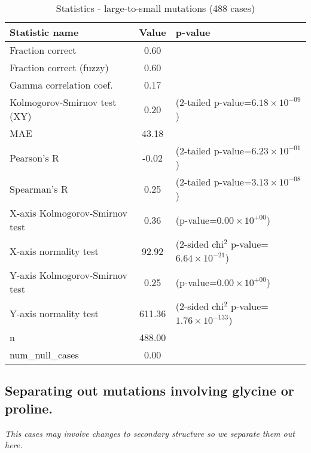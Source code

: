 \documentclass[10pt, letterpaper, oneside, titlepage, landscape]{scrreprt}
\begin{document}
\begin{table}[H]\begin{center}
\begin{tabular}{ l S[table-format=3.2] l}
Statistic name & {Value} & p-value\\
\hline
Fraction correct & 0.60 & \\
Fraction correct (fuzzy) & 0.60 & \\
Gamma correlation coef. & 0.17 & \\
Kolmogorov-Smirnov test (XY) & 0.20 & (2-tailed p-value=$6.18\times10^{-09}$)\\
MAE & 43.18 & \\
Pearson's R & -0.02 & (2-tailed p-value=$6.23\times10^{-01}$)\\
Spearman's R & 0.25 & (2-tailed p-value=$3.13\times10^{-08}$)\\
X-axis Kolmogorov-Smirnov test & 0.36 & (p-value=$0.00\times10^{+00}$)\\
X-axis normality test & 92.92 & (2-sided chi$^{2}$ p-value=$6.64\times10^{-21}$)\\
Y-axis Kolmogorov-Smirnov test & 0.25 & (p-value=$0.00\times10^{+00}$)\\
Y-axis normality test & 611.36 & (2-sided chi$^{2}$ p-value=$1.76\times10^{-133}$)\\
n & 488.00 & \\
num\_null\_cases & 0.00 & \\
\end{tabular}
\caption{Statistics - large-to-small mutations (488 cases)}
\end{center}\end{table}


\subsection{Separating out mutations involving glycine or proline.}
\textit{This cases may involve changes to secondary structure so we separate them out here.}
\end{document}
